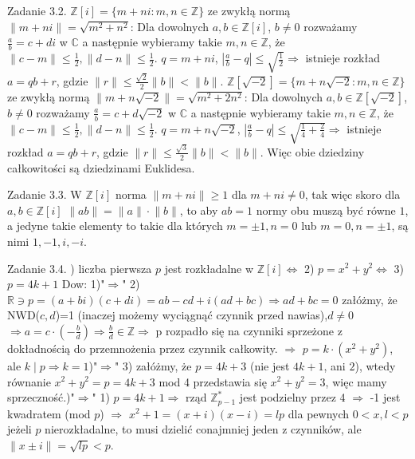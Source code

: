 \documentclass{article}
\begin{document}
Zadanie 3.2.
\newline
\newline
$\mathbb{Z}[i]=\{m+ni:m,n\in\mathbb{Z}\}$ ze zwykłą normą $\lVert m+ni\rVert=\sqrt{m^2+n^2}$:\newline
Dla dowolnych $a,b\in\mathbb{Z}[i]$, $b\neq 0$ rozważamy $\frac{a}{b}=c+di$ w $\mathbb{C}$
a następnie wybieramy takie $m,n\in\mathbb{Z}$, że $\lVert c-m\rVert\le\frac{1}{2},\lVert d-n\rVert\le\frac{1}{2}$.
$q=m+ni$, $|\frac{a}{b}-q|\le\sqrt{\frac{1}{2}}\Rightarrow$ istnieje rozkład $a=qb+r$, gdzie $\lVert r\rVert\le\frac{\sqrt{2}}{2}\lVert b\rVert<\lVert b\rVert$.\newline
$\mathbb{Z}[\sqrt{-2}]=\{m+n\sqrt{-2}:m,n\in\mathbb{Z}\}$ ze zwykłą normą $\lVert m+n\sqrt{-2}\rVert=\sqrt{m^2+2n^2}$:\newline
Dla dowolnych $a,b\in\mathbb{Z}[\sqrt{-2}]$, $b\neq 0$ rozważamy $\frac{a}{b}=c+d\sqrt{-2}$ w $\mathbb{C}$
a następnie wybieramy takie $m,n\in\mathbb{Z}$, że $\lVert c-m\rVert\le\frac{1}{2},\lVert d-n\rVert\le\frac{1}{2}$.
$q=m+n\sqrt{-2}$, $|\frac{a}{b}-q|\le\sqrt{\frac{1}{4}+\frac{2}{4}}\Rightarrow$ istnieje rozkład $a=qb+r$, gdzie $\lVert r\rVert\le\frac{\sqrt{3}}{2}\lVert b\rVert<\lVert b\rVert$.\newline
Więc obie dziedziny całkowitości są dziedzinami Euklidesa.
\newline

Zadanie 3.3.
\newline
\newline
W $\mathbb{Z}[i]$ norma $\lVert m+ni\rVert\ge 1$ dla $m+ni\neq0$, tak więc skoro dla $a,b\in\mathbb{Z}[i]$ $\lVert ab\rVert=\lVert a\rVert\cdot\lVert b\rVert$,
to aby $ab=1$ normy obu muszą być równe $1$, a jedyne takie elementy to takie dla których $m=\pm1,n=0$ lub $m=0,n=\pm1$, są nimi $1,-1,i,-i$.
\newpage

Zadanie 3.4.
\newline
{}) liczba pierwsza $p$ jest rozkładalne w $\mathbb{Z}[i]\Leftrightarrow$ 2) $p=x^2+y^2\Leftrightarrow$ 3) $p=4k+1$\newline
Dow: 1)"$\Rightarrow$" 2) $\mathbb{R}\ni p=(a+bi)(c+di)=ab-cd+i(ad+bc)\Rightarrow ad+bc=0$ załóżmy, że NWD($c,d$)=1 (inaczej możemy wyciągnąć czynnik przed nawias),$d\neq0$
$\Rightarrow a=c\cdot(-\frac{b}{d})\Rightarrow \frac{b}{d}\in\mathbb{Z}\Rightarrow$ p rozpadło się na czynniki sprzeżone z dokładnością do przemnożenia przez czynnik całkowity.
$\Rightarrow$ $p=k\cdot(x^2+y^2)$, ale $k\mid p\Rightarrow k=1$)"$\Rightarrow$" 3) załóżmy, że $p=4k+3$ (nie jest $4k+1$, ani $2$), wtedy równanie $x^2+y^2=p=4k+3$ mod 4 przedstawia się $x^2+y^2=3$, więc mamy sprzeczność.)"$\Rightarrow$" 1) $p=4k+1\Rightarrow$ rząd $\mathbb{Z}^*_{p-1}$ jest podzielny przez 4 $\Rightarrow$ -1 jest kwadratem (mod $p$) $\Rightarrow$ $x^2+1=(x+i)(x-i)=lp$ dla pewnych $0<x,l<p$
jeżeli $p$ nierozkładalne, to musi dzielić conajmniej jeden z czynników, ale $\lVert x\pm i\rVert=\sqrt{lp}<p$.
\newline
\end{document}
